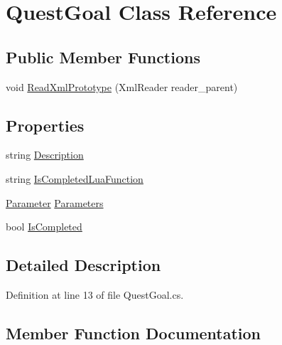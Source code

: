 \hypertarget{class_quest_goal}{}\section{Quest\+Goal Class Reference}
\label{class_quest_goal}
\subsection*{Public Member Functions}
\begin{DoxyCompactItemize}
\item 
void \hyperlink{class_quest_goal_a3cde7f12612f5ca40ca114b6049f6f3a}{Read\+Xml\+Prototype} (Xml\+Reader reader\+\_\+parent)
\end{DoxyCompactItemize}
\subsection*{Properties}
\begin{DoxyCompactItemize}
\item 
string \hyperlink{class_quest_goal_ad4b0bca1c6790c0e1a59d25f79ac7b78}{Description}
\item 
string \hyperlink{class_quest_goal_ac572c2786550e1ebe538d5e95d2f3dcf}{Is\+Completed\+Lua\+Function}
\item 
\hyperlink{class_parameter}{Parameter} \hyperlink{class_quest_goal_a0bc1dfd1a0a0e0c5d79abc984f9bcbc3}{Parameters}
\item 
bool \hyperlink{class_quest_goal_a7716d38f7f49316ccd0ce1a95487a819}{Is\+Completed}
\end{DoxyCompactItemize}


\subsection{Detailed Description}


Definition at line 13 of file Quest\+Goal.\+cs.



\subsection{Member Function Documentation}
\mbox{\label{class_quest_goal_a3cde7f12612f5ca40ca114b6049f6f3a}} 
